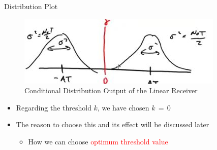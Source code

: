 \documentclass{Beamer}
\begin{document}
\begin{frame}[t]{Distribution Plot}

\begin{figure}[h]
\centering
\includegraphics[scale=0.6]{Figures/Baseband_Binary/output_rx_distirbution}
\caption{Conditional Distribution Output of the Linear Receiver}
\label{fig:Baseband_Binary:output_rx_distirbution}
\end{figure}

\begin{itemize}

\item Regarding the threshold $k$, we have chosen $k \, = \, 0$

\item The reason to choose this and its effect will be discussed later

	\begin{itemize}
	\item How we can choose \textcolor{red}{optimum threshold value}
	\end{itemize}

\end{itemize}

\end{frame}
\end{document}
